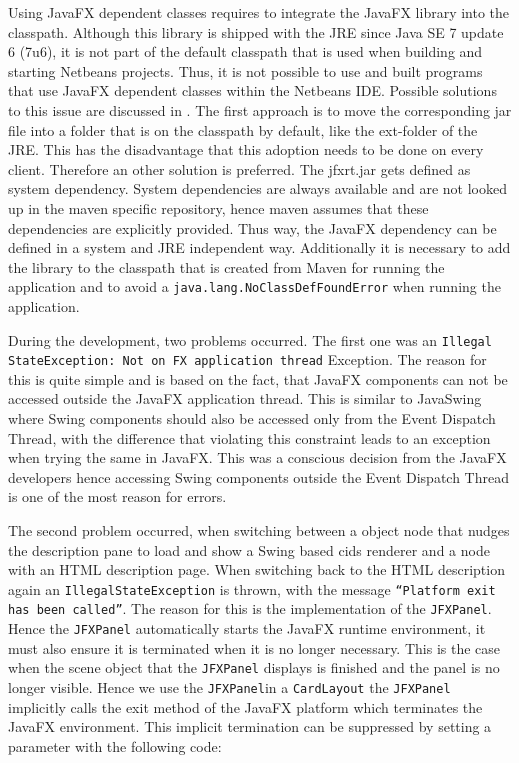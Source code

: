 Using JavaFX dependent classes requires to integrate the JavaFX library into the classpath.
Although this library is shipped with the JRE since Java SE 7 update 6 (7u6), it is not part of the default classpath that is used when building and starting Netbeans projects. Thus, it is not possible to use and built programs that use JavaFX dependent classes within the Netbeans IDE.
Possible solutions to this issue are discussed in \autocite{impl:fx-classpath}.
The first approach is to move the corresponding jar file into a folder that is on the classpath by default, like the ext-folder of the JRE.
This has the disadvantage that this adoption needs to be done on every client.
Therefore an other solution is preferred.
The jfxrt.jar gets defined as system dependency.
System dependencies are always available and are not looked up in the maven specific repository, hence maven assumes that these dependencies are explicitly provided.
Thus way, the JavaFX dependency can be defined in a system and JRE independent way.
Additionally it is necessary to add the library to the classpath that is created from Maven for running the application and to avoid a \texttt{java.lang.NoClassDefFoundError} when running the application.
 
During the development, two problems occurred.
The first one was an \texttt{Illegal} \texttt{StateException: Not on FX application thread} Exception.
The reason for this is quite simple and is based on the fact, that JavaFX components can not be accessed outside the JavaFX application thread.
This is similar to JavaSwing where Swing components should also be accessed only from the Event Dispatch Thread, with the difference that violating this constraint leads to an exception when trying the same in JavaFX.
This was a conscious decision from the JavaFX developers hence accessing Swing components outside the Event Dispatch Thread is one of the most reason for errors.

The second problem occurred, when switching between a object node that nudges the description pane to load and show a Swing based cids renderer and a node with an HTML description page.
When switching back to the HTML description again an \texttt{IllegalStateException} is thrown, with the message \texttt{\enquote{Platform exit has been called}}.
The reason for this is the implementation of the \texttt{JFXPanel}.
Hence the \texttt{JFXPanel} automatically starts the JavaFX runtime environment, it must also ensure it is terminated when it is no longer necessary.
This is the case when the scene object that the \texttt{JFXPanel} displays is finished and the panel is no longer visible.
Hence we use the \texttt{JFXPanel}in a \texttt{CardLayout} the \texttt{JFXPanel} implicitly calls the exit method of the JavaFX platform which terminates the JavaFX environment.
This implicit termination can be suppressed by setting a parameter with the following code:

